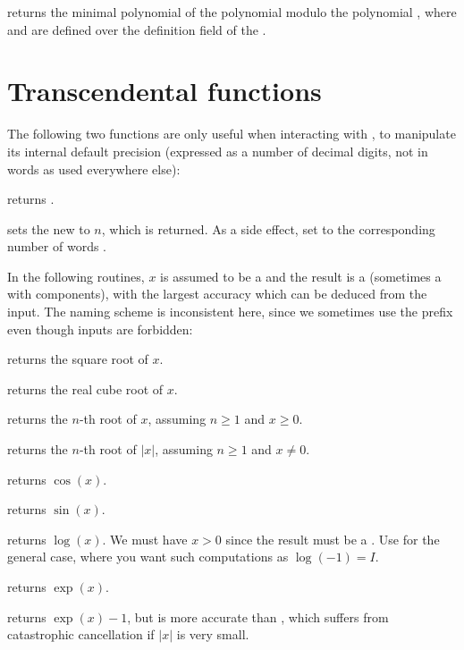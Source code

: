  returns the minimal
polynomial of the polynomial  modulo the polynomial , where
 and  are defined over the definition field of the 
.

\section{Transcendental functions}

The following two functions are only useful when interacting with ,
to manipulate its internal default precision (expressed as a number of
decimal digits, not in words as used everywhere else):

 returns .

 sets the new
 to $n$, which is returned. As a side effect, set
 to the corresponding number of words .


In the following routines, $x$ is assumed to be a  and the result
is a  (sometimes a  with  components), with
the largest accuracy which can be deduced from the input. The naming scheme
is inconsistent here, since we sometimes use the prefix  even though
 inputs are forbidden:

 returns the square root of $x$.

 returns the real cube root of $x$.

 returns the $n$-th root of $x$, assuming
$n\geq 1$ and $x \geq 0$.

 returns the $n$-th root of $|x|$,
assuming $n\geq 1$ and $x \neq 0$.

 returns $\cos(x)$.

 returns $\sin(x)$.

 returns $\log(x)$. We must have $x > 0$
since the result must be a . Use  for the general case,
where you want such computations as $\log(-1) = I$.

 returns $\exp(x)$.

 returns $\exp(x)-1$, but is more accurate than
, which suffers from catastrophic cancellation if
$|x|$ is very small.

